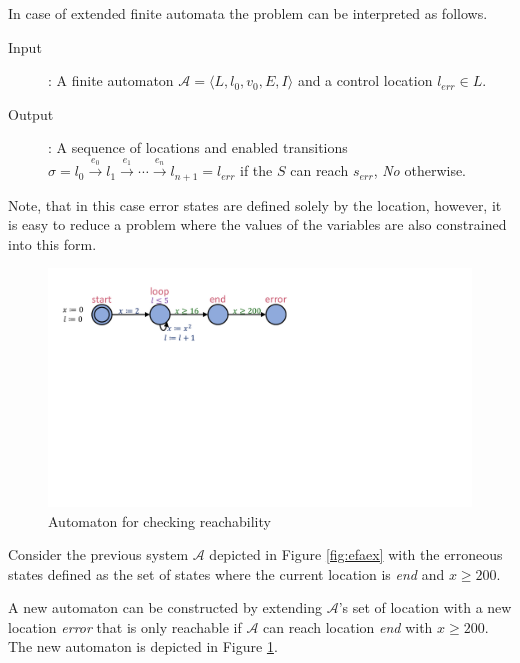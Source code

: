 In case of extended finite automata the problem can be interpreted as follows.
\begin{description}
	\item[Input]: A finite automaton $\mathcal{A}=\langle L,l_0,v_0, E, I\rangle$ and a control location $l_{err} \in L$.
	\item[Output]: A sequence of locations and enabled transitions $\sigma = l_0 \xrightarrow{e_0} l_1 \xrightarrow{e_1} \cdots \xrightarrow{e_n} l_{n+1}=l_{err}$ if the $S$ can reach $s_{err}$, \emph{No} otherwise.
\end{description}

Note, that in this case error states are defined solely by the location, however, it is easy to reduce a problem where the values of the variables are also constrained into this form.

\begin{figure}
	\centering
	\begin{minipage}{0.7\textwidth}
		\includegraphics[width=\textwidth]{include/figures/loop_example_error}%
		\caption{Automaton for checking reachability}
		\label{fig:efaexerr}
	\end{minipage}
\end{figure}

\begin{example}
	Consider the previous system $\mathcal{A}$ depicted in Figure \ref{fig:efaex} with the erroneous states defined as the set of states where the current location is \emph{end} and $x \geq 200$.
	
	A new automaton can be constructed by extending $\mathcal{A}$'s set of location with a new location \emph{error} that is only reachable if $\mathcal{A}$ can reach location \emph{end} with $x \geq 200$. The new automaton is depicted in Figure \ref{fig:efaexerr}.
\end{example}

